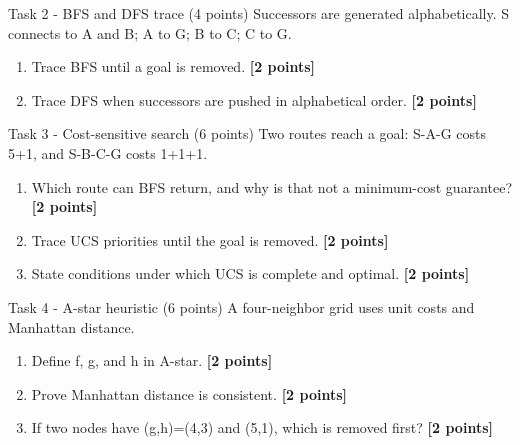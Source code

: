 \documentclass[aspectratio=169,11pt]{beamer}
\begin{document}
\begin{frame}{Task 2 - BFS and DFS trace (4 points)}
\small
Successors are generated alphabetically. S connects to A and B; A to G; B to C; C to G.

\vspace{0.2cm}
\begin{enumerate}
\item[\textbf{a.}] Trace BFS until a goal is removed. \hfill{\color{courseblue}\textbf{[2 points]}}
\item[\textbf{b.}] Trace DFS when successors are pushed in alphabetical order. \hfill{\color{courseblue}\textbf{[2 points]}}
\end{enumerate}
\end{frame}

\begin{frame}{Task 3 - Cost-sensitive search (6 points)}
\small
Two routes reach a goal: S-A-G costs 5+1, and S-B-C-G costs 1+1+1.

\vspace{0.2cm}
\begin{enumerate}
\item[\textbf{a.}] Which route can BFS return, and why is that not a minimum-cost guarantee? \hfill{\color{courseblue}\textbf{[2 points]}}
\item[\textbf{b.}] Trace UCS priorities until the goal is removed. \hfill{\color{courseblue}\textbf{[2 points]}}
\item[\textbf{c.}] State conditions under which UCS is complete and optimal. \hfill{\color{courseblue}\textbf{[2 points]}}
\end{enumerate}
\end{frame}

\begin{frame}{Task 4 - A-star heuristic (6 points)}
\small
A four-neighbor grid uses unit costs and Manhattan distance.

\vspace{0.2cm}
\begin{enumerate}
\item[\textbf{a.}] Define f, g, and h in A-star. \hfill{\color{courseblue}\textbf{[2 points]}}
\item[\textbf{b.}] Prove Manhattan distance is consistent. \hfill{\color{courseblue}\textbf{[2 points]}}
\item[\textbf{c.}] If two nodes have (g,h)=(4,3) and (5,1), which is removed first? \hfill{\color{courseblue}\textbf{[2 points]}}
\end{enumerate}
\end{frame}
\end{document}

